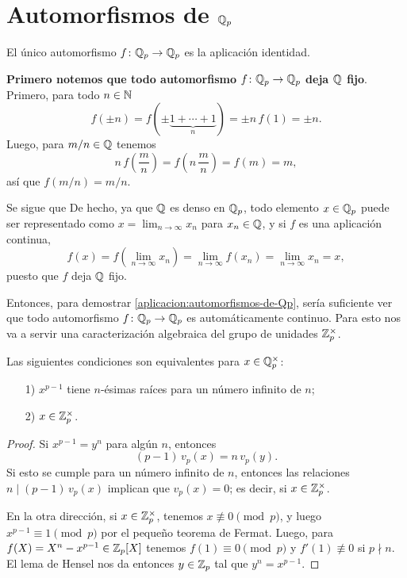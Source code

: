 \documentclass{article}
\numberwithin{equation}{section}
\theoremstyle{definition}
\begin{document}

\section{Automorfismos de $\mathbb{Q}_p$}

\begin{proposicion}
  \label{aplicacion:automorfismos-de-Qp}
  El único automorfismo $f\colon \mathbb{Q}_p\to\mathbb{Q}_p$ es la aplicación identidad.
\end{proposicion}

\textbf{Primero notemos que todo automorfismo $f\colon \mathbb{Q}_p\to\mathbb{Q}_p$ deja $\mathbb{Q}$
  fijo}. Primero, para todo $n\in\mathbb{N}$
$$f (\pm n) = f (\pm \underbrace{1 + \cdots + 1}_n) = \pm n\,f (1) = \pm n.$$
Luego, para $m/n \in \mathbb{Q}$ tenemos
$$n\,f \left(\frac{m}{n}\right) = f \left(n\,\frac{m}{n}\right) = f (m) = m,$$
así que $f (m/n) = m/n$.

\vspace{1em}

Se sigue que  De hecho, ya que $\mathbb{Q}$ es
denso en $\mathbb{Q}_p$, todo elemento $x\in \mathbb{Q}_p$ puede ser representado como
$x = \lim_{n\to\infty} x_n$ para $x_n\in \mathbb{Q}$, y si $f$ es una aplicación
continua,
\[ f (x) =
   f \left(\lim_{n\to\infty} x_n\right) =
   \lim_{n\to\infty} f (x_n) = \lim_{n\to\infty} x_n = x, \]
puesto que $f$ deja $\mathbb{Q}$ fijo.

\vspace{1em}

Entonces, para demostrar \ref{aplicacion:automorfismos-de-Qp}, sería suficiente
ver que todo automorfismo $f\colon \mathbb{Q}_p\to\mathbb{Q}_p$ es automáticamente
continuo. Para esto nos va a servir una caracterización algebraica del grupo
de unidades $\mathbb{Z}_p^\times$.

\begin{lema}
  Las siguientes condiciones son equivalentes para $x\in\mathbb{Q}_p^\times$:

  \begin{enumerate}
  \item[1)] $x^{p-1}$ tiene $n$-ésimas raíces para un número infinito de $n$;

  \item[2)] $x\in\mathbb{Z}_p^\times$.
  \end{enumerate}

  \begin{proof}
    Si $x^{p-1} = y^n$ para algún $n$, entonces
    $$(p-1)\,v_p (x) = n\,v_p (y).$$
    Si esto se cumple para un número infinito de $n$, entonces las relaciones
    $n \mid (p-1)\,v_p (x)$ implican que $v_p (x) = 0$; es decir, si
    $x\in\mathbb{Z}_p^\times$.

    En la otra dirección, si $x\in\mathbb{Z}_p^\times$, tenemos
    $x\not\equiv 0 \pmod{p}$, y luego $x^{p-1} \equiv 1 \pmod{p}$ por el pequeño
    teorema de Fermat. Luego, para $f (X) = X^n - x^{p-1} \in \mathbb{Z}_p [X]$ tenemos
    $f (1) \equiv 0 \pmod{p}$ y $f' (1) \not\equiv 0$ si $p\nmid n$. El lema
    de Hensel nos da entonces $y\in\mathbb{Z}_p$ tal que $y^n = x^{p-1}$.
  \end{proof}
\end{lema}
\end{document}
